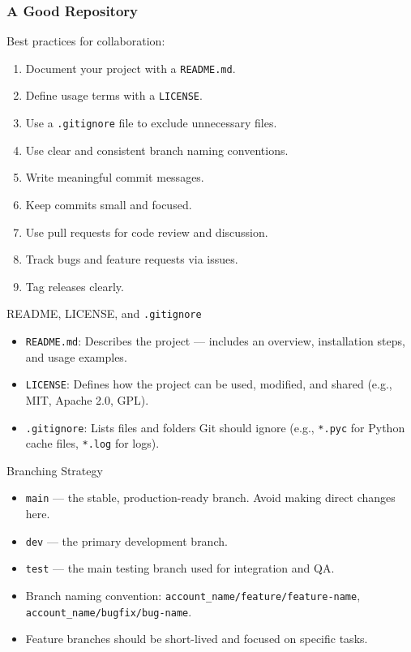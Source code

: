 \documentclass[12pt]{beamer}
\begin{document}
\begin{frame}
  \frametitle{A Good Repository}
  Best practices for collaboration:
  \begin{enumerate}
    \item Document your project with a \texttt{README.md}.
    \item Define usage terms with a \texttt{LICENSE}.
    \item Use a \texttt{.gitignore} file to exclude unnecessary files.
    \item Use clear and consistent branch naming conventions.
    \item Write meaningful commit messages.
    \item Keep commits small and focused.
    \item Use pull requests for code review and discussion.
    \item Track bugs and feature requests via issues.
    \item Tag releases clearly.
  \end{enumerate}
\end{frame}

\begin{frame}{README, LICENSE, and \texttt{.gitignore}}
  \begin{itemize}
    \setlength\itemsep{1em}
    \item \texttt{README.md}: Describes the project — includes an overview, installation steps, and usage examples.
    \item \texttt{LICENSE}: Defines how the project can be used, modified, and shared (e.g., MIT, Apache 2.0, GPL).
    \item \texttt{.gitignore}: Lists files and folders Git should ignore (e.g., \texttt{*.pyc} for Python cache files, \texttt{*.log} for logs).
  \end{itemize}
\end{frame}

\begin{frame}{Branching Strategy}
  \begin{itemize}
    \setlength\itemsep{1em}
    \item \texttt{main} — the stable, production-ready branch. Avoid making direct changes here.
    \item \texttt{dev} — the primary development branch.
    \item \texttt{test} — the main testing branch used for integration and QA.
    \item Branch naming convention: \texttt{account\_name/feature/feature-name}, \texttt{account\_name/bugfix/bug-name}.
    \item Feature branches should be short-lived and focused on specific tasks.
  \end{itemize}
\end{frame}
\end{document}
